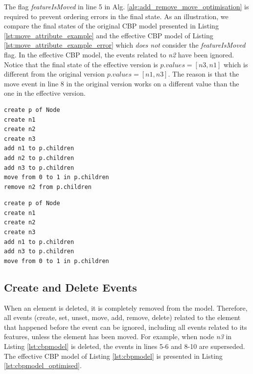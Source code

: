 \documentclass{llncs}
\begin{document}
The flag \emph{featureIsMoved} in line 5 in Alg. \ref{alg:add_remove_move_optimisation} is required to prevent ordering errors in the final state.
As an illustration, we compare the final states of the original CBP model presented in Listing  \ref{lst:move_attribute_example} and the effective CBP model of Listing \ref{lst:move_attribute_example_error} which \emph{does not} consider the \emph{featureIsMoved} flag.
In the effective CBP model, the events related to \emph{n2} have been ignored.
Notice that the final state of the effective version is $p.values = [n3, n1]$  which is different from the original version $p.values = [n1, n3]$.
The reason is that the move event in line 8 in the original version works on a different value than the one in the effective version.

\noindent
\begin{minipage}[t]{0.48\linewidth}
\begin{lstlisting}[style=eol,caption={The CBP representation of reference \emph{children}'s move event.},label=lst:move_attribute_example]
create p of Node
create n1
create n2
create n3
add n1 to p.children
add n2 to p.children
add n3 to p.children
move from 0 to 1 in p.children
remove n2 from p.children
\end{lstlisting}
\end{minipage}
\hfill
\begin{minipage}[t]{0.48\linewidth}
\begin{lstlisting}[style=eol,caption={The effective CBP representation of reference \emph{children}'s move event.},label=lst:move_attribute_example_error]
create p of Node
create n1
create n2
create n3
add n1 to p.children
add n3 to p.children
move from 0 to 1 in p.children
\end{lstlisting}
\end{minipage}


\subsection{Create and Delete Events}
\label{subsec:create_and_delete_operations}
When an element is deleted, it is completely removed from the model.
Therefore, all events (create, set, unset, move, add, remove, delete) related to the element that happened before the event can be ignored, including all events related to its features, unless the element has been moved.
For example, when node \emph{n3} in Listing \ref{lst:cbpmodel}  is deleted, the events in lines 5-6 and 8-10 are superseded.
The effective CBP model of Listing \ref{lst:cbpmodel} is presented in Listing \ref{lst:cbpmodel_optimised}.
\end{document}
